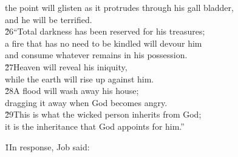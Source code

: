 \begin{poetry}
\poemll    the point will glisten as it protrudes through his gall bladder, \\
\poemlll       and he will be terrified. \\
\poeml \v{26}``Total darkness has been reserved for his treasures; \\
\poemll    a fire that has no need to be kindled will devour him \\
\poemlll       and consume whatever remains in his possession. \\
\poeml \v{27}Heaven will reveal his iniquity, \\
\poemll    while the earth will rise up against him. \\
\poeml \v{28}A flood will wash away his house; \\
\poemll    dragging it away when God becomes angry. \\
\poeml \v{29}This is what the wicked person inherits from God; \\
\poemll    it is the inheritance that God appoints for him.''
\end{poetry}

\v{1}In response, Job said:

